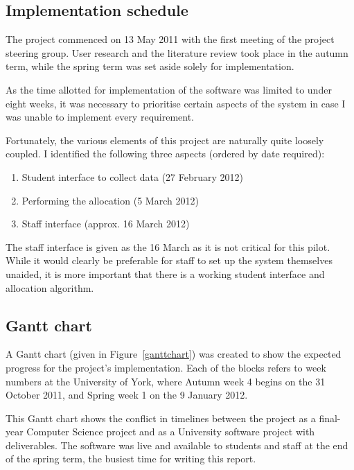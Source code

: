 
\subsection{Implementation schedule}

The project commenced on 13 May 2011 with the first meeting of the project
steering group. User research and the literature review took place in the
autumn term, while the spring term was set aside solely for implementation.

As the time allotted for implementation of the software was limited to under
eight weeks, it was necessary to prioritise certain aspects of the system in
case I was unable to implement every requirement.

Fortunately, the various elements of this project are naturally quite loosely
coupled. I identified the following three aspects (ordered by date required):

\begin{enumerate}
  \item Student interface to collect data (27 February 2012)
  \item Performing the allocation (5 March 2012)
  \item Staff interface (approx. 16 March 2012)
\end{enumerate}

The staff interface is given as the 16 March as it is not critical for this
pilot. While it would clearly be preferable for staff to set up the system
themselves unaided, it is more important that there is a working student
interface and allocation algorithm.

\subsection{Gantt chart}

A Gantt chart (given in Figure~\ref{ganttchart}) was created to show the
expected progress for the project's implementation. Each of the blocks refers
to week numbers at the University of York, where Autumn week 4 begins on the
31 October 2011, and Spring week 1 on the 9 January 2012.

This Gantt chart shows the conflict in timelines between the project as a
final-year Computer Science project and as a University software project with
deliverables. The software was live and available to students and staff at the
end of the spring term, the busiest time for writing this report.


